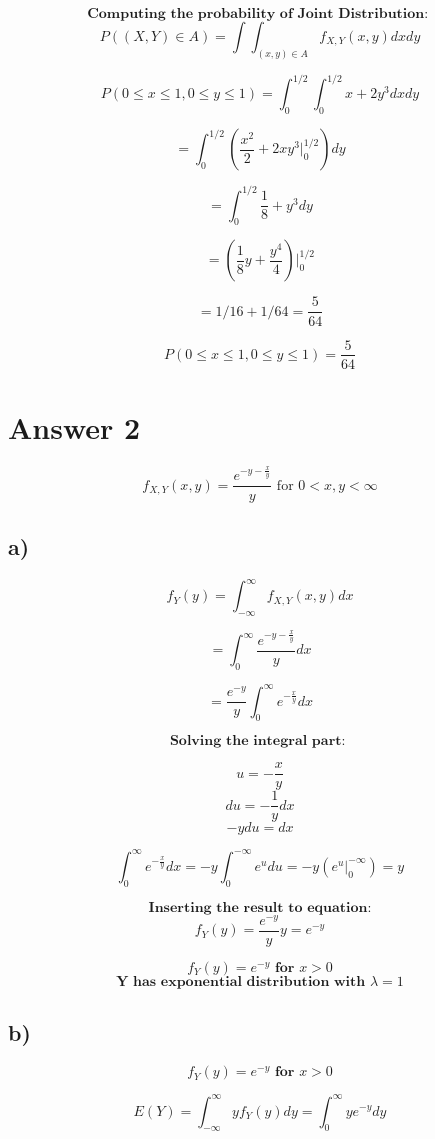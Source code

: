 \documentclass[12pt]{article}
\begin{document}
\[\textbf{Computing the probability of Joint Distribution: }\]
\[P((X,Y) \in A) = \int\int_{(x,y)\in A}f_{X,Y}(x,y) dx dy \]

\[ P( 0 \leq x \leq 1 , 0 \leq y \leq 1 ) = \int_{0}^{1/2}\int_{0}^{1/2}x+2y^3 dx dy \]

\[ = \int_{0}^{1/2}(\frac{x^2}{2}+2xy^3 \Big|_0^{1/2})dy \]

\[ = \int_{0}^{1/2}\frac{1}{8}+y^3 dy \]

\[ = (\frac{1}{8}y + \frac{y^4}{4}) \Big|_0^{1/2} \]

\[ = 1/16 + 1/64 = \frac{5}{64}\]


\[ P( 0 \leq x \leq 1 , 0 \leq y \leq 1 ) = \frac{5}{64} \]


\section*{Answer 2}

\[f_{X,Y}(x,y) = \frac{e^{ -y-\frac{x}{y} } } {y}  \text{   for } 0 < x,y < \infty\]


\subsection*{a)} 

\[f_Y(y) = \int_{-\infty}^{\infty} f_{X,Y}(x,y) dx \]

\[ = \int_{0}^{\infty} \frac{e^{ -y-\frac{x}{y} } } {y} dx  \]

\[ = \frac{e^{-y}}{y} \int_0^{\infty} e^{-\frac{x}{y} } dx \]

\[\textbf{Solving the integral part: }  \]

\[u = -\frac{x}{y}\]
\[ du = -\frac{1}{y}dx\]
\[ -y du = dx\]

\[ \int_0^{\infty} e^{-\frac{x}{y}} dx =  -y\int_0^{-\infty} e^u du = -y(e^u \big|_0^{-\infty}) = y\]


\[ \textbf{Inserting the result to equation:} \]
\[f_Y(y) = \frac{e^{-y}}{y}y = e^{-y} \]

\[f_Y(y) = e^{-y} \textbf{ for }x > 0 \]
\[ \textbf{Y has exponential distribution with } \lambda = 1\]


\subsection*{b)} 

\[f_Y(y) = e^{-y} \textbf{ for }x > 0 \]

\[E(Y) = \int_{-\infty}^{\infty} yf_Y(y) dy  =  \int_{0}^{\infty} ye^{-y} dy \]
\end{document}
